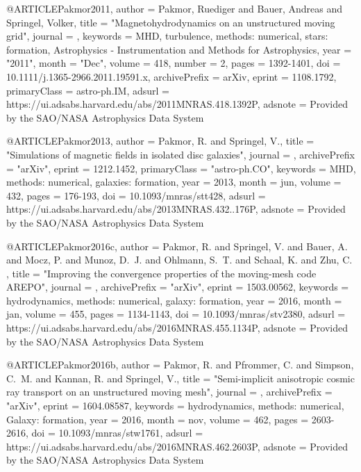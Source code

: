 \documentclass[useAMS,usenatbib]{mnras}
\begin{document}
{{{{{{@ARTICLE{Pakmor2011,
       author = {{Pakmor}, Ruediger and {Bauer}, Andreas and {Springel}, Volker},
        title = "{Magnetohydrodynamics on an unstructured moving grid}",
      journal = {\mnras},
     keywords = {MHD, turbulence, methods: numerical, stars: formation, Astrophysics - Instrumentation and Methods for Astrophysics},
         year = "2011",
        month = "Dec",
       volume = {418},
       number = {2},
        pages = {1392-1401},
          doi = {10.1111/j.1365-2966.2011.19591.x},
archivePrefix = {arXiv},
       eprint = {1108.1792},
 primaryClass = {astro-ph.IM},
       adsurl = {https://ui.adsabs.harvard.edu/abs/2011MNRAS.418.1392P},
      adsnote = {Provided by the SAO/NASA Astrophysics Data System}
}

@ARTICLE{Pakmor2013,
   author = {{Pakmor}, R. and {Springel}, V.},
    title = "{Simulations of magnetic fields in isolated disc galaxies}",
  journal = {\mnras},
archivePrefix = "arXiv",
   eprint = {1212.1452},
 primaryClass = "astro-ph.CO",
 keywords = {MHD, methods: numerical, galaxies: formation},
     year = 2013,
    month = jun,
   volume = 432,
    pages = {176-193},
      doi = {10.1093/mnras/stt428},
   adsurl = {https://ui.adsabs.harvard.edu/abs/2013MNRAS.432..176P},
  adsnote = {Provided by the SAO/NASA Astrophysics Data System}
}

@ARTICLE{Pakmor2016c,
   author = {{Pakmor}, R. and {Springel}, V. and {Bauer}, A. and {Mocz}, P. and 
	{Munoz}, D.~J. and {Ohlmann}, S.~T. and {Schaal}, K. and {Zhu}, C.
	},
    title = "{Improving the convergence properties of the moving-mesh code AREPO}",
  journal = {\mnras},
archivePrefix = "arXiv",
   eprint = {1503.00562},
 keywords = {hydrodynamics, methods: numerical, galaxy: formation},
     year = 2016,
    month = jan,
   volume = 455,
    pages = {1134-1143},
      doi = {10.1093/mnras/stv2380},
   adsurl = {https://ui.adsabs.harvard.edu/abs/2016MNRAS.455.1134P},
  adsnote = {Provided by the SAO/NASA Astrophysics Data System}
}

@ARTICLE{Pakmor2016b,
   author = {{Pakmor}, R. and {Pfrommer}, C. and {Simpson}, C.~M. and {Kannan}, R. and 
	{Springel}, V.},
    title = "{Semi-implicit anisotropic cosmic ray transport on an unstructured moving mesh}",
  journal = {\mnras},
archivePrefix = "arXiv",
   eprint = {1604.08587},
 keywords = {hydrodynamics, methods: numerical, Galaxy: formation},
     year = 2016,
    month = nov,
   volume = 462,
    pages = {2603-2616},
      doi = {10.1093/mnras/stw1761},
   adsurl = {https://ui.adsabs.harvard.edu/abs/2016MNRAS.462.2603P},
  adsnote = {Provided by the SAO/NASA Astrophysics Data System}
}

}}}}}}
\end{document}
